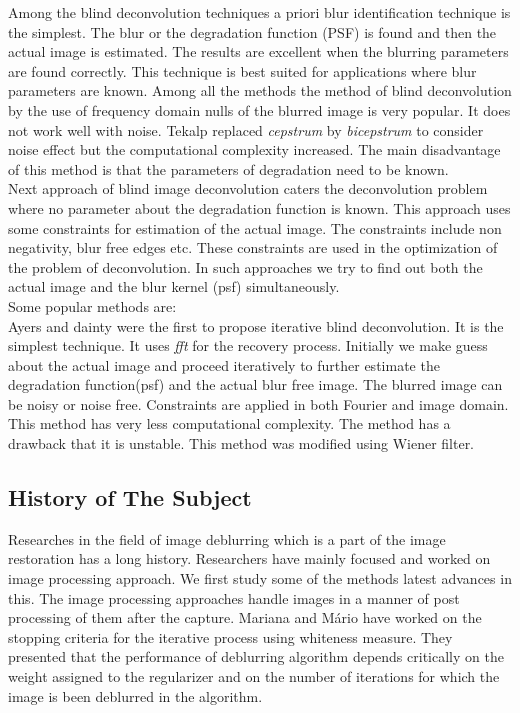 \documentclass{article}
\begin{document}
Among the blind deconvolution techniques a priori blur identification technique is the simplest. The blur or the degradation function (PSF) is found and then the actual image is estimated. The results are excellent when the blurring parameters are found correctly. This technique is best suited for applications where blur parameters are known. Among all the methods the method of blind deconvolution by the use of frequency domain nulls of the blurred image is very popular. It does not work well with noise. Tekalp \cite{chang-mm} replaced \textit{cepstrum} by \textit{bicepstrum} to consider noise effect but the computational complexity increased. The main disadvantage of this method is that the parameters of degradation need to be known.  \\

Next approach of blind image deconvolution caters the deconvolution problem where no parameter about the degradation function is known. This approach uses some constraints for estimation of the actual image. The constraints include non negativity, blur free edges etc. These constraints are used in the optimization of the problem of deconvolution. In such approaches we try to find out both the actual image and the blur kernel (psf) simultaneously. \\

Some popular methods are: \\

Ayers and dainty \cite{5} were the first to propose iterative blind deconvolution. It is the simplest technique. It uses \textit{fft} for the recovery process. Initially we make guess about the actual image and proceed iteratively to further estimate the degradation function(psf) and the actual blur free image. The blurred image can be noisy or noise free. Constraints are applied in both Fourier and image domain. This method has very less computational complexity. The method has a drawback that it is unstable. This method was modified using Wiener filter.

\subsection{History of The Subject}
Researches in the field of image deblurring which is a part of the image restoration has a long history. Researchers have mainly focused and worked on image processing approach. We first study some of the methods latest advances in this. The image processing approaches handle images in a manner of post processing of them after the capture. Mariana and Mário \cite{9} have worked on the stopping criteria for the iterative process using whiteness measure. They presented that the performance of deblurring algorithm depends critically on the weight assigned to the regularizer and on the number of iterations for which the image is been deblurred in the algorithm. \\
\end{document}
